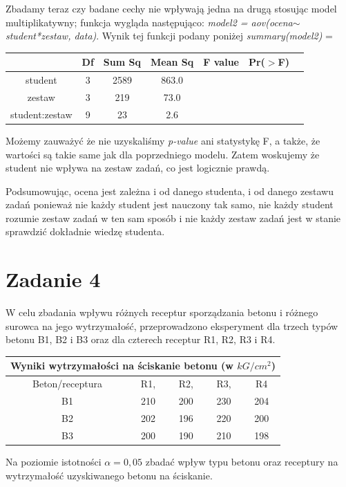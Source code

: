 \documentclass{article}
\begin{document}
Zbadamy teraz czy badane cechy nie wpływają jedna na drugą stosując model multiplikatywny; funkcja wygląda następująco: \textit{model2 = aov(ocena$\sim$student*zestaw, data)}. Wynik tej funkcji podany poniżej \textit{summary(model2)} =
\begin{center} \begin{tabular}{|c|c|c|c|c|c|c|} \hline
& Df & Sum Sq & Mean Sq & F value & Pr($>$F) & \\ \hline
student & 3 & 2589 & 863.0 & & & \\ \hline
zestaw & 3 & 219 & 73.0 & & & \\ \hline
student:zestaw & 9 & 23 & 2.6 & & & \\ \hline
\end{tabular} \end{center}
Możemy zauważyć że nie uzyskaliśmy \textit{p-value} ani statystykę F, a także, że wartości są takie same jak dla poprzedniego modelu. Zatem woskujemy że student nie wpływa na zestaw zadań, co jest logicznie prawdą. \\ \par

Podsumowując, ocena jest zależna i od danego studenta, i od danego zestawu zadań ponieważ nie każdy student jest nauczony tak samo, nie każdy student rozumie zestaw zadań w ten sam sposób i nie każdy zestaw zadań jest w stanie sprawdzić dokładnie wiedzę studenta.

\newpage
\section{Zadanie 4}
W celu zbadania wpływu różnych receptur sporządzania betonu i różnego surowca na
jego wytrzymałość, przeprowadzono eksperyment dla trzech typów betonu B1, B2 i B3
oraz dla czterech receptur R1, R2, R3 i R4.
\begin{center} \begin{tabular}{|c|cccc|}
\multicolumn{5}{c}{Wyniki wytrzymałości na ściskanie betonu (w $kG/cm^2$)} \\ \hline
Beton/receptura & R1, & R2, & R3, & R4 \\ \hline
B1 & 210 & 200 & 230 & 204 \\
B2 & 202 & 196 & 220 & 200 \\
B3 & 200 & 190 & 210 & 198 \\ \hline
\end{tabular} \end{center}
Na poziomie istotności $\alpha = 0,05$ zbadać wpływ typu betonu oraz receptury na
wytrzymałość uzyskiwanego betonu na ściskanie. \\ \par
\end{document}
